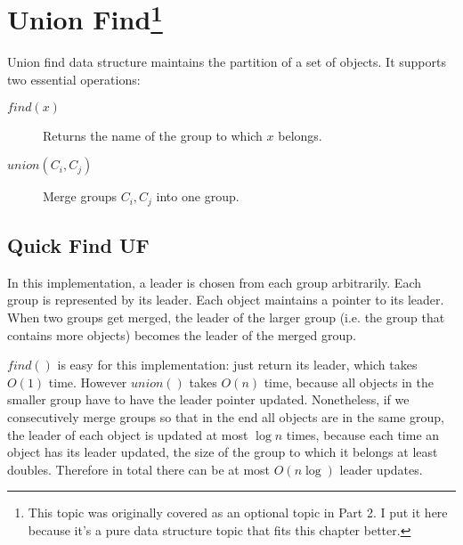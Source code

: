 \section[Union Find]{Union Find\protect\footnote{This topic was originally covered as an optional topic in Part 2. I put it here because it's a pure data structure topic that fits this chapter better.}}\label{unionfind}
Union find data structure maintains the partition of a set of objects. It supports two essential operations:
\begin{description}
\item[$find(x)$]Returns the name of the group to which $x$ belongs.
\item[$union(C_i, C_j)$]Merge groups $C_i,C_j$ into one group.
\end{description} 
\subsection{Quick Find UF}
\begin{multicols}{2}
\begin{algorithmic}[1]
\EndFunction
\end{algorithmic}
\columnbreak
\begin{algorithmic}[1]
\EndFor
{}
\Else
{}
\EndFor
{}
\EndIf
\EndFunction
\end{algorithmic}
\end{multicols}
In this implementation, a leader is chosen from each group arbitrarily. Each group is represented by its leader. Each object maintains a pointer to its leader. When two groups get merged, the leader of the larger group (i.e. the group that contains more objects) becomes the leader of the merged group. 

$find()$ is easy for this implementation: just return its leader, which takes $O(1)$ time. However $union()$ takes $O(n)$ time, because all objects in the smaller group have to have the leader pointer updated. Nonetheless, if we consecutively merge groups so that in the end all objects are in the same group, the leader of each object is updated at most $\log n$ times, because each time an object has its leader updated, the size of the group to which it belongs at least doubles. Therefore in total there can be at most $O(n\log )$ leader updates.
